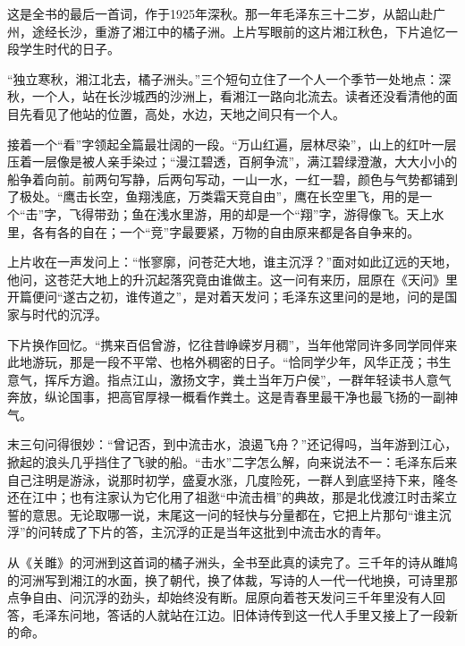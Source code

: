 \begin{appreciation}
这是全书的最后一首词，作于1925年深秋。那一年毛泽东三十二岁，从韶山赴广州，途经长沙，重游了湘江中的橘子洲。上片写眼前的这片湘江秋色，下片追忆一段学生时代的日子。

“独立寒秋，湘江北去，橘子洲头。”三个短句立住了一个人一个季节一处地点：深秋，一个人，站在长沙城西的沙洲上，看湘江一路向北流去。读者还没看清他的面目先看见了他站的位置，高处，水边，天地之间只有一个人。

接着一个“看”字领起全篇最壮阔的一段。“万山红遍，层林尽染”，山上的红叶一层压着一层像是被人亲手染过；“漫江碧透，百舸争流”，满江碧绿澄澈，大大小小的船争着向前。前两句写静，后两句写动，一山一水，一红一碧，颜色与气势都铺到了极处。“鹰击长空，鱼翔浅底，万类霜天竞自由”，鹰在长空里飞，用的是一个“击”字，飞得带劲；鱼在浅水里游，用的却是一个“翔”字，游得像飞。天上水里，各有各的自在；一个“竞”字最要紧，万物的自由原来都是各自争来的。

上片收在一声发问上：“怅寥廓，问苍茫大地，谁主沉浮？”面对如此辽远的天地，他问，这苍茫大地上的升沉起落究竟由谁做主。这一问有来历，屈原在《天问》里开篇便问“遂古之初，谁传道之”，是对着天发问；毛泽东这里问的是地，问的是国家与时代的沉浮。

下片换作回忆。“携来百侣曾游，忆往昔峥嵘岁月稠”，当年他常同许多同学同伴来此地游玩，那是一段不平常、也格外稠密的日子。“恰同学少年，风华正茂；书生意气，挥斥方遒。指点江山，激扬文字，粪土当年万户侯”，一群年轻读书人意气奔放，纵论国事，把高官厚禄一概看作粪土。这是青春里最干净也最飞扬的一副神气。

末三句问得很妙：“曾记否，到中流击水，浪遏飞舟？”还记得吗，当年游到江心，掀起的浪头几乎挡住了飞驶的船。“击水”二字怎么解，向来说法不一：毛泽东后来自己注明是游泳，说那时初学，盛夏水涨，几度险死，一群人到底坚持下来，隆冬还在江中；也有注家认为它化用了祖逖“中流击楫”的典故，那是北伐渡江时击桨立誓的意思。无论取哪一说，末尾这一问的轻快与分量都在，它把上片那句“谁主沉浮”的问转成了下片的答，主沉浮的正是当年这批到中流击水的青年。

从《关雎》的河洲到这首词的橘子洲头，全书至此真的读完了。三千年的诗从雎鸠的河洲写到湘江的水面，换了朝代，换了体裁，写诗的人一代一代地换，可诗里那点争自由、问沉浮的劲头，却始终没有断。屈原向着苍天发问三千年里没有人回答，毛泽东问地，答话的人就站在江边。旧体诗传到这一代人手里又接上了一段新的命。
\end{appreciation}
